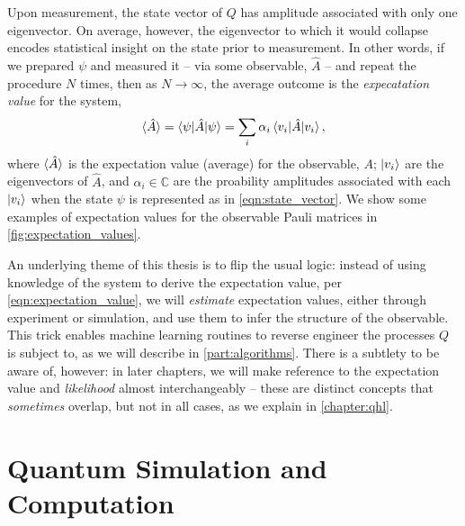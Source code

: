 {Upon measurement, the state vector of $Q$ has amplitude associated with only one eigenvector. 
On average, however, the eigenvector to which it would collapse encodes statistical insight on the 
    state prior to measurement. 
In other words, if we prepared $\psi$ and measured it -- via some observable, $\hat{A}$ -- 
    and repeat the procedure $N$ times, 
    then as $N \rightarrow \infty$, the average outcome is the \emph{expecatation value}
    for the system, 
\begin{equation}
    \label{eqn:expectation_value}
    \braket{\hat{A}} = \braket{\psi | \hat{A} | \psi} = \sum\limits_{i} \alpha_i \braket{v_i | \hat{A} | v_i},  
\end{equation}
    where $\braket{\hat{A}}$ is the \gls{expectation value} (average) for the observable, $A$; 
    $\ket{v_i}$ are the eigenvectors of $\hat{A}$, and $\alpha_i \in \mathbb{C}$ are the proability amplitudes
    associated with each $\ket{v_i}$ when the state $\psi$ is represented as in \cref{eqn:state_vector}.
We show some examples of \glspl{expectation value} for the observable Pauli matrices in \cref{fig:expectation_values}. 
\par 

An underlying theme of this thesis is to flip the usual logic: 
    instead of using knowledge of the system to derive the \gls{expectation value}, per \cref{eqn:expectation_value},
    we will \emph{estimate} \glspl{expectation value}, either through experiment or simulation, 
    and use them to infer the structure of the observable.
This trick enables machine learning routines to reverse engineer 
    the processes $Q$ is subject to, as we will describe in \cref{part:algorithms}. 
There is a subtlety to be aware of, however: 
    in later chapters, we will make reference to the \gls{expectation value} and \emph{\gls{likelihood}} 
    almost interchangeably -- these are distinct concepts that \emph{sometimes} overlap, but not in all cases,
    as we explain in \cref{chapter:qhl}. 



\section{Quantum Simulation and Computation}

}
